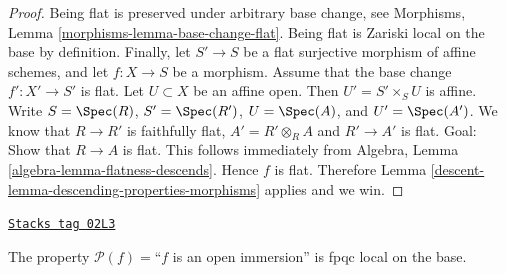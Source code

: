 \begin{proof}

Being flat is preserved under arbitrary base change, see
Morphisms, Lemma \ref{morphisms-lemma-base-change-flat}.
Being flat is Zariski local on the base by definition.
Finally, let
$S' \to S$ be a flat surjective morphism of affine schemes,
and let $f : X \to S$ be a morphism. Assume that the base change
$f' : X' \to S'$ is flat.
Let $U \subset X$ be an affine open. Then $U' = S' \times_S U$
is affine. Write
$S = \Spec(R)$,
$S' = \Spec(R')$,
$U = \Spec(A)$, and
$U' = \Spec(A')$.
We know that $R \to R'$ is faithfully flat,
$A' = R' \otimes_R A$ and $R' \to A'$ is flat.
Goal: Show that $R \to A$ is flat.
This follows immediately from
Algebra, Lemma \ref{algebra-lemma-flatness-descends}.
Hence $f$ is flat.
Therefore Lemma \ref{descent-lemma-descending-properties-morphisms} applies and we win.
\end{proof}

\begin{lemma}
\label{descent-lemma-descending-property-open-immersion}
\href{https://stacks.math.columbia.edu/tag/02L3}{\texttt{Stacks tag 02L3}}

The property $\mathcal{P}(f) =$``$f$ is an open immersion''
is fpqc local on the base.
\end{lemma}

